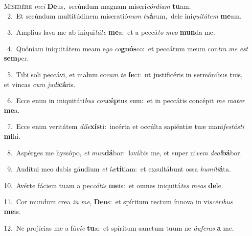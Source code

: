 \lettrine{\initial\textcolor{\initialcolor}{M}}{iserére} \textit{me}\-\textit{i} \textbf{De}\-us,~\star secúndum magnam miseri\-\textit{cór}\-\textit{di}\textit{am} \textbf{tu}\-am.\\
{\numbfont\textcolor{\numbcolor}{~2.}}~Et secúndum multitúdinem miseratió\textit{num} \textit{tu}\-\textbf{á}rum,~\star dele ini\-\textit{qui}\-\textit{tá}\textit{tem} \textbf{me}\-am.\par
{\numbfont\textcolor{\numbcolor}{~3.}}~Amplius lava me ab iniqui\-\textit{tá}\-\textit{te} \textbf{me}\-a:~\star et a peccá\textit{to} \textit{me}\-\textit{o} \textbf{mun}\-da me.\par
{\numbfont\textcolor{\numbcolor}{~4.}}~Quóniam iniquitátem meam e\textit{go} \textit{co}\-\textbf{gnós}co:~\star et peccátum meum con\textit{tra} \textit{me} \textit{est} \textbf{sem}\-per.\par
{\numbfont\textcolor{\numbcolor}{~5.}}~Tibi soli peccávi, et malum co\textit{ram} \textit{te} \textbf{fe}\-ci:~\star ut justificéris in sermónibus tuis, et vincas \textit{cum} \textit{ju}\-\textit{di}\textbf{cá}ris.\par
{\numbfont\textcolor{\numbcolor}{~6.}}~Ecce enim in iniquitáti\textit{bus} \textit{con}\-\textbf{cép}tus sum:~\star et in peccátis concépit \textit{me} \textit{ma}\-\textit{ter} \textbf{me}\-a.\par
{\numbfont\textcolor{\numbcolor}{~7.}}~Ecce enim veritátem \textit{di}\-\textit{le}\textbf{xís}ti:~\star incérta et occúlta sapiéntiæ tuæ mani\-\textit{fes}\-\textit{tás}\textit{ti} \textbf{mi}\-hi.\par
{\numbfont\textcolor{\numbcolor}{~8.}}~Aspérges me hyssópo, \textit{et} \textit{mun}\-\textbf{dá}bor:~\star lavábis me, et super ni\textit{vem} \textit{de}\-\textit{al}\textbf{bá}bor.\par
{\numbfont\textcolor{\numbcolor}{~9.}}~Audítui meo dabis gáudium \textit{et} \textit{læ}\-\textbf{tí}tiam:~\star et exsultábunt ossa \textit{hu}\-\textit{mi}\textit{li}\textbf{á}ta.\par
{\numbfont\textcolor{\numbcolor}{10.}}~Avérte fáciem tuam a pec\-\textit{cá}\-\textit{tis} \textbf{me}\-is:~\star et omnes iniquitá\textit{tes} \textit{me}\-\textit{as} \textbf{de}\-le.\par
{\numbfont\textcolor{\numbcolor}{11.}}~Cor mundum crea \textit{in} \textit{me}\-, \textbf{De}\-us:~\star et spíritum rectum ínnova in vi\-\textit{scé}\-\textit{ri}\textit{bus} \textbf{me}\-is.\par
{\numbfont\textcolor{\numbcolor}{12.}}~Ne projícias me a fá\-\textit{ci}\-\textit{e} \textbf{tu}\-a:~\star et spíritum sanctum tuum ne \textit{áu}\-\textit{fe}\textit{ras} \textbf{a} me.\par
